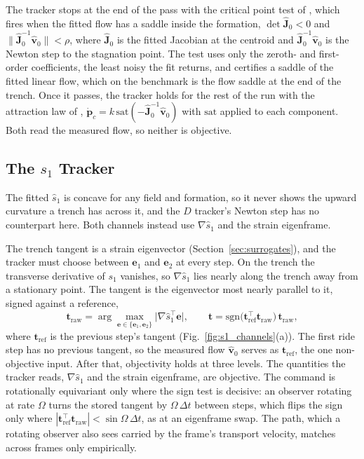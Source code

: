 \documentclass[lettersize,journal]{IEEEtran}
\begin{document}
The tracker stops at the end of the pass with the critical point test of
\cite{10}, which fires when the fitted flow has a saddle inside the
formation,
$\det\hat{\mathbf{J}}_0 < 0$ and
$\|\hat{\mathbf{J}}_0^{-1}\hat{\mathbf{v}}_0\| < \rho$, where $\hat{\mathbf{J}}_0$ is the fitted Jacobian at the centroid and
$\hat{\mathbf{J}}_0^{-1}\hat{\mathbf{v}}_0$ is the Newton step to the
stagnation point. The test uses only the zeroth- and first-order
coefficients, the least noisy the fit returns, and certifies a saddle of
the fitted linear flow, which on the benchmark is the flow saddle at the
end of the trench. Once it passes, the tracker
holds for the rest of the run with the attraction law of \cite{10},
$\dot{\mathbf{p}}_c = k\,\mathrm{sat}(-\hat{\mathbf{J}}_0^{-1}\hat{\mathbf{v}}_0)$
with $\mathrm{sat}$ applied to each component. Both read the measured
flow, so neither is objective.

\subsection{The $s_1$ Tracker}
\label{sec:s1_controller}

The fitted $\hat{s}_1$ is concave for any field and formation, so it
never shows the upward curvature a
trench has across it, and the $D$ tracker's Newton step has no counterpart
here. Both channels instead use $\nabla\hat{s}_1$ and the strain
eigenframe.

The trench tangent is a strain eigenvector (Section~\ref{sec:surrogates}),
and the tracker must choose between $\mathbf{e}_1$ and $\mathbf{e}_2$ at
every step. On the trench the transverse derivative of $s_1$ vanishes, so
$\nabla\hat{s}_1$ lies nearly along the trench away from a stationary
point. The tangent is the eigenvector most nearly parallel to it, signed
against a reference,
\begin{equation}
    \mathbf{t}_{\mathrm{raw}} =
    \arg\max_{\mathbf{e} \in \{\mathbf{e}_1, \mathbf{e}_2\}}
    \bigl\lvert \nabla\hat{s}_1^\top \mathbf{e} \bigr\rvert,
    \qquad
    \mathbf{t} = \mathrm{sgn}\bigl(\mathbf{t}_{\mathrm{ref}}^\top
    \mathbf{t}_{\mathrm{raw}}\bigr)\,\mathbf{t}_{\mathrm{raw}},
    \label{eq:tangent_select}
\end{equation}
where $\mathbf{t}_{\mathrm{ref}}$ is the previous step's tangent
(Fig.~\ref{fig:s1_channels}(a)). The first ride step has no previous
tangent, so the measured flow $\hat{\mathbf{v}}_0$ serves as
$\mathbf{t}_{\mathrm{ref}}$, the one non-objective input. After that,
objectivity holds at three levels. The quantities the tracker reads,
$\nabla\hat{s}_1$ and the strain eigenframe, are objective. The command
is rotationally equivariant only where the sign test is decisive: an
observer rotating at rate $\Omega$ turns the stored tangent by
$\Omega\,\Delta t$ between steps, which flips the sign only where
\mbox{$|\mathbf{t}_{\mathrm{ref}}^\top\mathbf{t}_{\mathrm{raw}}| <
\sin\Omega\,\Delta t$}, as at an eigenframe swap. The path, which a
rotating observer also sees carried by the frame's transport velocity,
matches across frames only empirically.
\end{document}
